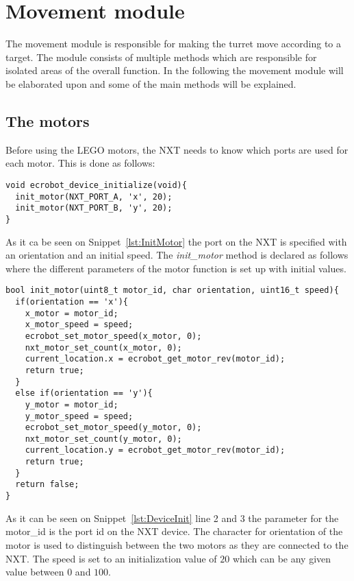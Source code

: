 \section{Movement module}
The movement module is responsible for making the turret move according to a target.
The module consists of multiple methods which are responsible for isolated areas of the overall function. 
In the following the movement module will be elaborated upon and some of the main methods will be explained. 

\subsection{The motors}
Before using the LEGO motors, the NXT needs to know which ports are used for each motor. 
This is done as follows:
\begin{lstlisting}[language=CSharp, label={lst:DeviceInit},caption={ecrobot\_device\_initialize method from movement.c}]
void ecrobot_device_initialize(void){
  init_motor(NXT_PORT_A, 'x', 20);
  init_motor(NXT_PORT_B, 'y', 20);
}
\end{lstlisting}
As it ca be seen on Snippet~\ref{lst:InitMotor} the port on the NXT is specified with an orientation and an initial speed.
The \textit{init\_motor} method is declared as follows where the different parameters of the motor function is set up with initial values.

\begin{lstlisting}[language=CSharp,label={lst:InitMotor},caption={init\_motor method from movement.c}]
bool init_motor(uint8_t motor_id, char orientation, uint16_t speed){
  if(orientation == 'x'){
    x_motor = motor_id;
    x_motor_speed = speed;
    ecrobot_set_motor_speed(x_motor, 0);
    nxt_motor_set_count(x_motor, 0);
    current_location.x = ecrobot_get_motor_rev(motor_id);
    return true;
  }
  else if(orientation == 'y'){
    y_motor = motor_id;
    y_motor_speed = speed;
    ecrobot_set_motor_speed(y_motor, 0);
    nxt_motor_set_count(y_motor, 0);
    current_location.y = ecrobot_get_motor_rev(motor_id);
    return true;
  }
  return false;
}
\end{lstlisting}
As it can be seen on Snippet~\ref{lst:DeviceInit} line 2 and 3 the parameter for the motor\_id is the port id on the NXT device. 
The character for orientation of the motor is used to distinguish between the two motors as they are connected to the NXT.
The speed is set to an initialization value of $20$ which can be any given value between $0$ and $100$.

